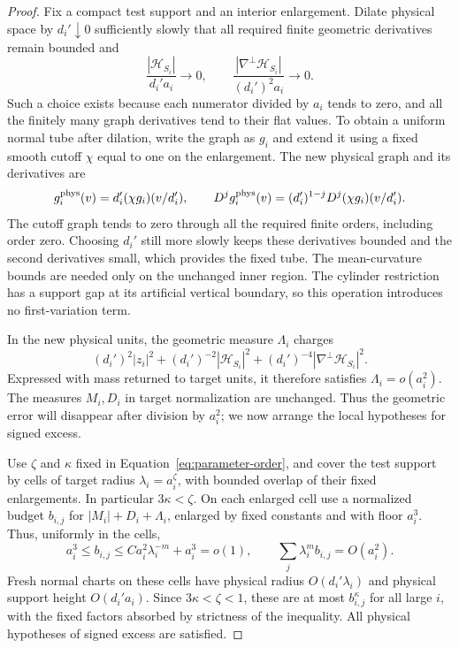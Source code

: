 \begin{proof}
Fix a compact test support and an interior enlargement. Dilate physical
space by $d_i'\downarrow0$ sufficiently slowly that all required finite
geometric derivatives remain bounded and
\[
 \frac{|\mathcal H_{S_i}|}{d_i'a_i}\longrightarrow0,
 \qquad
 \frac{|\nabla^\perp\mathcal H_{S_i}|}{(d_i')^2a_i}\longrightarrow0.
\]
Such a choice exists because each numerator divided by $a_i$ tends to
zero, and all the finitely many graph derivatives tend to their flat
values. To obtain a uniform normal tube after dilation, write the graph
as $g_i$ and extend it using a fixed smooth cutoff $\chi$ equal to one
on the enlargement. The new physical graph and its derivatives are
\[
 g_i^{\rm phys}(v)=d_i'(\chi g_i)(v/d_i'),\qquad
 D^j g_i^{\rm phys}(v)
   =(d_i')^{1-j}D^j(\chi g_i)(v/d_i').
\]
The cutoff graph tends to zero through all the required finite orders,
including order zero. Choosing $d_i'$ still more slowly keeps these
derivatives bounded and the second derivatives small, which provides
the fixed tube. The mean-curvature bounds are needed only on the
unchanged inner region. The cylinder restriction has a support gap at
its artificial vertical boundary, so this operation introduces no
first-variation term.

In the new physical units, the geometric measure $\Lambda_i$ charges
\[
 (d_i')^2|z_i|^2+(d_i')^{-2}|\mathcal H_{S_i}|^2
                  +(d_i')^{-4}|\nabla^\perp\mathcal H_{S_i}|^2.
\]
Expressed with mass returned to target units, it therefore satisfies
$\Lambda_i=o(a_i^2)$. The measures $M_i,D_i$ in target normalization
are unchanged. Thus the geometric error will disappear after division
by $a_i^2$; we now arrange the local hypotheses for signed excess.

Use $\zeta$ and $\kappa$ fixed in Equation~\eqref{eq:parameter-order},
and cover the test support by cells of
target radius $\lambda_i=a_i^\zeta$, with bounded overlap of their fixed
enlargements. In particular $3\kappa<\zeta$. On each enlarged cell use a normalized budget
$b_{i,j}$ for $|M_i|+D_i+\Lambda_i$, enlarged by fixed constants and
with floor $a_i^3$. Thus, uniformly in the cells,
\begin{equation}\label{eq:signed-cell-budget}
 a_i^3\le b_{i,j}\le C a_i^2\lambda_i^{-m}+a_i^3=o(1),
 \qquad \sum_j\lambda_i^m b_{i,j}=O(a_i^2).
\end{equation}
Fresh normal charts on these cells have physical radius
$O(d_i'\lambda_i)$ and physical support height $O(d_i'a_i)$.
Since $3\kappa<\zeta<1$, these are at most $b_{i,j}^{\kappa}$ for
all large $i$, with the fixed factors absorbed by strictness of the
inequality. All physical hypotheses of signed excess are satisfied.


\end{proof}
